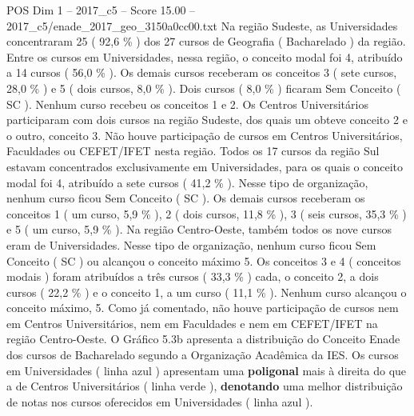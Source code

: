\begin{textsample}{POS Dim 1 – 2017\_c5 – Score 15.00 – 2017\_c5/enade\_2017\_geo\_3150a0cc00.txt}
Na região Sudeste, as Universidades concentraram 25 ( 92,6 \% ) dos 27 cursos de Geografia ( Bacharelado ) da região.
Entre os cursos em Universidades, nessa região, o conceito modal foi 4, atribuído a 14 cursos ( 56,0 \% ).
Os demais cursos receberam os conceitos 3 ( sete cursos, 28,0 \% ) e 5 ( dois cursos, 8,0 \% ).
Dois cursos ( 8,0 \% ) ficaram Sem Conceito ( SC ).
Nenhum curso recebeu os conceitos 1 e 2.
Os Centros Universitários participaram com dois cursos na região Sudeste, dos quais um obteve conceito 2 e o outro, conceito 3.
Não houve participação de cursos em Centros Universitários, Faculdades ou CEFET/IFET nesta região.
Todos os 17 cursos da região Sul estavam concentrados exclusivamente em Universidades, para os quais o conceito modal foi 4, atribuído a sete cursos ( 41,2 \% ).
Nesse tipo de organização, nenhum curso ficou Sem Conceito ( SC ).
Os demais cursos receberam os conceitos 1 ( um curso, 5,9 \% ), 2 ( dois cursos, 11,8 \% ), 3 ( seis cursos, 35,3 \% ) e 5 ( um curso, 5,9 \% ).
Na região Centro-Oeste, também todos os nove cursos eram de Universidades.
Nesse tipo de organização, nenhum curso ficou Sem Conceito ( SC ) ou alcançou o conceito máximo 5.
Os conceitos 3 e 4 ( conceitos modais ) foram atribuídos a três cursos ( 33,3 \% ) cada, o conceito 2, a dois cursos ( 22,2 \% ) e o conceito 1, a um curso ( 11,1 \% ).
Nenhum curso alcançou o conceito máximo, 5.
Como já comentado, não houve participação de cursos nem em Centros Universitários, nem em Faculdades e nem em CEFET/IFET na região Centro-Oeste.
O Gráfico 5.3b apresenta a distribuição do Conceito Enade dos cursos de Bacharelado segundo a Organização Acadêmica da IES.
Os cursos em Universidades ( linha azul ) apresentam uma \textbf{poligonal} mais à direita do que a de Centros Universitários ( linha verde ), \textbf{denotando} uma melhor distribuição de notas nos cursos oferecidos em Universidades ( linha azul ).

\end{textsample}
